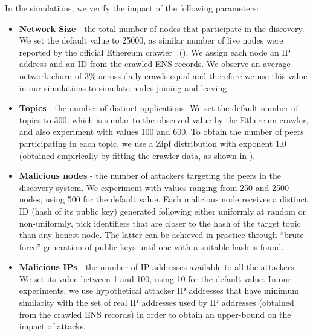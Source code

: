 In the simulations, we verify the impact of the following parameters:
 \begin{itemize}
     \item \textbf{Network Size} - the total number of nodes that participate in the discovery. We set the default value to 25000, as similar number of live nodes were reported by the official Ethereum crawler~\cite{discv4-dns-lists} (). We assign each node an IP address and an ID from the crawled ENS records. We observe an average network churn of 3\% across daily crawls equal and therefore we use this value in our simulations to simulate nodes joining and leaving. 
     \item \textbf{Topics} - the number of distinct applications. We set the default number of topics to 300, which is similar to the observed value by the Ethereum crawler, and also experiment with values 100 and 600. To obtain the number of peers participating in each topic, we use a Zipf distribution with exponent $1.0$ (obtained empirically by fitting the crawler data, as shown in ). 
     \item \textbf{Malicious nodes} - the number of attackers targeting the peers in the discovery system. We experiment with values ranging from 250 and 2500 nodes,  using 500 for the default value.  Each malicious node receives a distinct ID (\ie hash of its public key) generated following either uniformly at random or non-uniformly, \ie pick identifiers that are closer to the hash of the target topic than any honest node. The latter can be achieved in practice through ``brute-force'' generation of public keys until one with a suitable hash is found.
     \item \textbf{Malicious IPs} - the number of IP addresses available to all the attackers. We set its value between 1 and 100, using 10 for the default value. In our experiments, we use hypothetical attacker IP addresses that have minimum similarity with the set of real IP addresses used by IP addresses (obtained from the crawled ENS records) in order to obtain an upper-bound on the impact of attacks. %

 \end{itemize}


